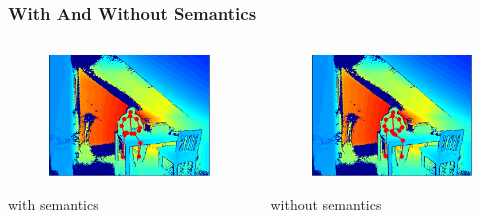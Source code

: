 \documentclass[xcolor=dvipsnames]{beamer}
\begin{document}
\begin{frame}
\frametitle{With And Without Semantics}
	\begin{columns}
		\begin{column}{.5\textwidth}
			\begin{figure}
				\includegraphics[width=\textwidth]{img/res1.png}
			\end{figure}
			\begin{center}
				with semantics
			\end{center}
		\end{column}
		\begin{column}{.5\textwidth}
			\begin{figure}
				\includegraphics[width=\textwidth]{img/res2.png}
			\end{figure}
			\begin{center}
				without semantics
			\end{center}
		\end{column}
	\end{columns}
\end{frame}
\end{document}
